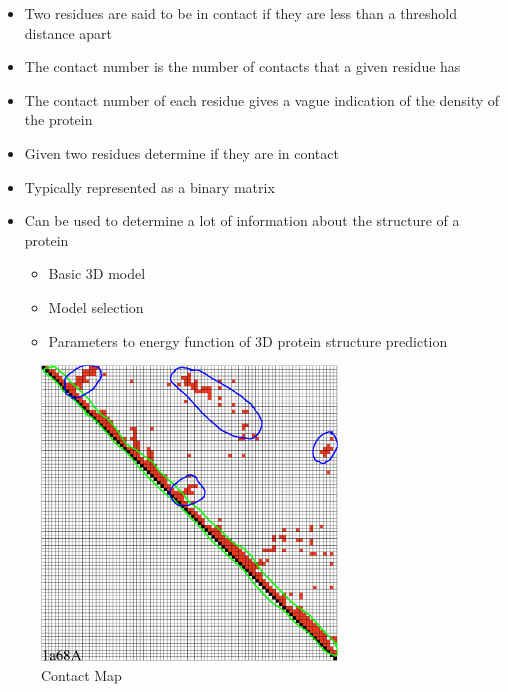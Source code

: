 \documentclass[a4paper]{article}
\begin{document}

\begin{itemize}
  \item
    Two residues are said to be in contact if they are less than a threshold
    distance apart

  \item
    The contact number is the number of contacts that a given residue has

  \item
    The contact number of each residue gives a vague indication of the density
    of the protein
\end{itemize}


\begin{itemize}
  \item
    Given two residues determine if they are in contact

  \item
    Typically represented as a binary matrix

  \item
    Can be used to determine a lot of information about the structure of a
    protein

    \begin{itemize}
      \item
        Basic 3D model

      \item
        Model selection

      \item
        Parameters to energy function of 3D protein structure prediction
    \end{itemize}
\end{itemize}

\begin{figure}[h!]
  \centering
  \includegraphics[width=0.7\textwidth]{graphics/protein_contact_map.eps}
  \caption{Contact Map}
  \label{fig:protein_contact_map}
\end{figure}
\FloatBarrier
\end{document}
